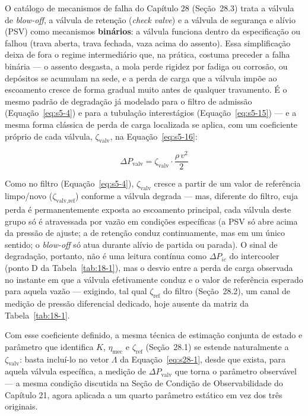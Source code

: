 \documentclass[12pt,a4paper]{article}
\numberwithin{equation}{section}
\numberwithin{table}{section}
\numberwithin{figure}{section}
\begin{document}
	O catálogo de mecanismos de falha do Capítulo 28 (Seção~28.3) trata a válvula de \textit{blow-off}, a válvula de retenção (\textit{check valve}) e a válvula de segurança e alívio (PSV) como mecanismos \textbf{binários}: a válvula funciona dentro da especificação ou falhou (trava aberta, trava fechada, vaza acima do assento). Essa simplificação deixa de fora o regime intermediário que, na prática, costuma preceder a falha binária — o assento desgasta, a mola perde rigidez por fadiga ou corrosão, ou depósitos se acumulam na sede, e a perda de carga que a válvula impõe ao escoamento cresce de forma gradual muito antes de qualquer travamento. É o mesmo padrão de degradação já modelado para o filtro de admissão (Equação~\eqref{eq:s5-4}) e para a tubulação interestágios (Equação~\eqref{eq:s5-15}) — e a mesma forma clássica de perda de carga localizada se aplica, com um coeficiente próprio de cada válvula, $\zeta_{\text{valv}}$, na Equação~\eqref{eq:s5-16}:

	\begin{equation}\label{eq:s5-16}
	\Delta P_{\text{valv}} = \zeta_{\text{valv}} \cdot \frac{\rho \, v^2}{2}
	\end{equation}

	Como no filtro (Equação~\eqref{eq:s5-4}), $\zeta_{\text{valv}}$ cresce a partir de um valor de referência limpo/novo ($\zeta_{\text{valv,ref}}$) conforme a válvula degrada — mas, diferente do filtro, cuja perda é permanentemente exposta ao escoamento principal, cada válvula deste grupo só é atravessada por vazão em condições específicas (a PSV só abre acima da pressão de ajuste; a de retenção conduz continuamente, mas em um único sentido; o \textit{blow-off} só atua durante alívio de partida ou parada). O sinal de degradação, portanto, não é uma leitura contínua como $\Delta P_{ic}$ do intercooler (ponto D da Tabela~\ref{tab:18-1}), mas o desvio entre a perda de carga observada no instante em que a válvula efetivamente conduz e o valor de referência esperado para aquela vazão — exigindo, tal qual $\zeta_{\text{ref}}$ do filtro (Seção~28.2), um canal de medição de pressão diferencial dedicado, hoje ausente da matriz da Tabela~\ref{tab:18-1}.

	Com esse coeficiente definido, a mesma técnica de estimação conjunta de estado e parâmetro que identifica $K$, $\eta_{\text{mec}}$ e $\zeta_{\text{ref}}$ (Seção~28.1) se estende naturalmente a $\zeta_{\text{valv}}$: basta incluí-lo no vetor $\Lambda$ da Equação~\eqref{eq:s28-1}, desde que exista, para aquela válvula específica, a medição de $\Delta P_{\text{valv}}$ que torna o parâmetro observável — a mesma condição discutida na Seção de Condição de Observabilidade do Capítulo 21, agora aplicada a um quarto parâmetro estático em vez dos três originais.
\end{document}

